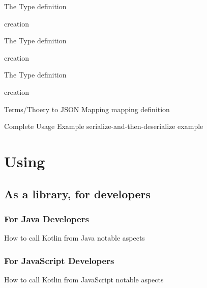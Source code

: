 \documentclass[handout]{beamer}
\begin{document}
\begin{frame}[allowframebreaks]{The  Type}
    definition

    creation
\end{frame}

\begin{frame}[allowframebreaks]{The  Type}
    definition

    creation
\end{frame}

\begin{frame}[allowframebreaks]{The  Type}
    definition

    creation
\end{frame}

\begin{frame}[allowframebreaks]{Terms/Thoery to JSON Mapping}
    mapping definition
\end{frame}

\begin{frame}[allowframebreaks]{Complete Usage Example}
    serialize-and-then-deserialize example
\end{frame}

\section{Using \twopkt}

\subsection{As a library, for developers}

\subsubsection{For Java Developers}

\begin{frame}[allowframebreaks]{How to call Kotlin from Java}
    notable aspects
\end{frame}

\subsubsection{For JavaScript Developers}

\begin{frame}[allowframebreaks]{How to call Kotlin from JavaScript}
    notable aspects
\end{frame}
\end{document}
